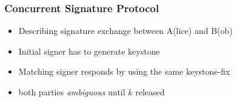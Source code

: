 \begin{frame}
	\frametitle{Concurrent Signature Protocol}

	\begin{itemize}
		\setlength\itemsep{1em}
		\item Describing signature exchange between A(lice) and B(ob)
		\item Initial signer has to generate keystone
		\item Matching signer responds by using the same keystone-fix
		\item both parties \textit{ambiguous} until $k$ released
	\end{itemize}
\end{frame}





